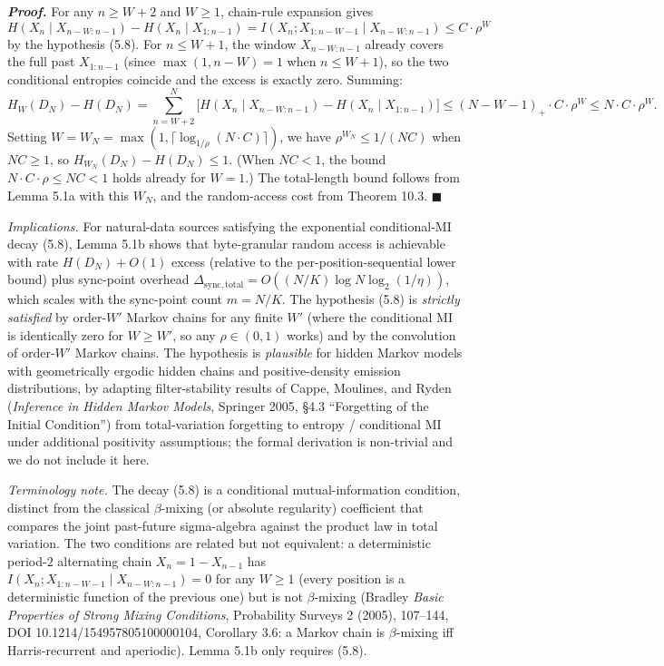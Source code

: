 \documentclass[
]{article}
\begin{document}
\emph{\textbf{Proof.}} For any $n \geq W + 2$ and $W \geq 1$,
chain-rule expansion gives
\[
H(X_n \mid X_{n-W:n-1}) - H(X_n \mid X_{1:n-1})
= I(X_n; X_{1:n-W-1} \mid X_{n-W:n-1}) \leq C \cdot \rho^W
\]
by the hypothesis (5.8). For $n \leq W + 1$, the window
$X_{n-W:n-1}$ already covers the full past $X_{1:n-1}$ (since
$\max(1, n - W) = 1$ when $n \leq W + 1$), so the two conditional
entropies coincide and the excess is exactly zero. Summing:
\[
H_W(D_N) - H(D_N) = \sum_{n = W + 2}^N \bigl[H(X_n \mid X_{n-W:n-1}) - H(X_n \mid X_{1:n-1})\bigr]
\leq (N - W - 1)_+ \cdot C \cdot \rho^W
\leq N \cdot C \cdot \rho^W.
\]
Setting $W = W_N = \max(1, \lceil \log_{1/\rho}(N \cdot C) \rceil)$,
we have $\rho^{W_N} \leq 1/(N C)$ when $NC \geq 1$, so
$H_{W_N}(D_N) - H(D_N) \leq 1$. (When $NC < 1$, the bound
$N \cdot C \cdot \rho \leq NC < 1$ holds already for $W = 1$.) The
total-length bound follows from Lemma 5.1a with this $W_N$, and the
random-access cost from Theorem 10.3.
\hfill$\blacksquare$

\emph{Implications.} For natural-data sources satisfying the
exponential conditional-MI decay (5.8), Lemma 5.1b shows that
byte-granular random access is achievable with rate $H(D_N) + O(1)$
excess (relative to the per-position-sequential lower bound) plus
sync-point overhead $\Delta_{\mathrm{sync,total}} = O((N/K) \log N
\log_2(1/\eta))$, which scales with the sync-point count
$m = N/K$. The hypothesis (5.8) is
\emph{strictly satisfied} by order-$W'$ Markov chains for any
finite $W'$ (where the conditional MI is identically zero for
$W \geq W'$, so any $\rho \in (0, 1)$ works) and by the convolution
of order-$W'$ Markov chains. The hypothesis is \emph{plausible} for
hidden Markov models with geometrically ergodic hidden chains and
positive-density emission distributions, by adapting filter-stability
results of Cappe, Moulines, and Ryden (\emph{Inference in Hidden
Markov Models}, Springer 2005, \S 4.3 ``Forgetting of the Initial
Condition'') from total-variation forgetting to entropy / conditional
MI under additional positivity assumptions; the formal derivation
is non-trivial and we do not include it here.

\emph{Terminology note.} The decay (5.8) is a conditional
mutual-information condition, distinct from the classical
$\beta$-mixing (or absolute regularity) coefficient that compares
the joint past-future sigma-algebra against the product law in total
variation. The two conditions are related but not equivalent: a
deterministic period-$2$ alternating chain $X_n = 1 - X_{n-1}$ has
$I(X_n ; X_{1:n-W-1} \mid X_{n-W:n-1}) = 0$ for any $W \geq 1$
(every position is a deterministic function of the previous one) but
is not $\beta$-mixing (Bradley \emph{Basic Properties of Strong
Mixing Conditions}, Probability Surveys 2 (2005), 107--144, DOI
10.1214/154957805100000104, Corollary 3.6: a Markov chain is
$\beta$-mixing iff Harris-recurrent and aperiodic).
Lemma 5.1b only requires (5.8).
\end{document}
